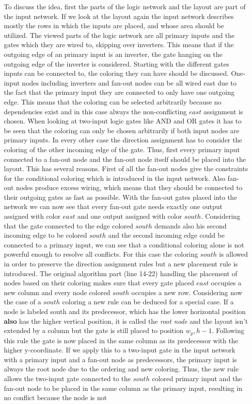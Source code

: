 To discuss the idea, first the parts of the logic network and the layout are part of the input network. If we look at the layout again the input network describes mostly the rows in which the inputs are placed, and whose area should be utilized. The viewed parts of the logic network are all primary inputs and the gates which they are wired to, skipping over inverters. This means that if the outgoing edge of an primary input is an inverter, the gate hanging on the outgoing edge of the inverter is considered. Starting with the different gates inputs can be connected to, the coloring they can have should be discussed. One-input nodes including inverters and fan-out nodes can be all wired east due to the fact that the primary input they are connected to only have one outgoing edge. This means that the coloring can be selected arbitrarily because no dependencies exist and in this case always the non-conflicting $east$ assignment is chosen. When looking at two-input logic gates like AND and OR gates it has to be seen that the coloring can only be chosen arbitrarily if both input nodes are primary inputs. In every other case the direction assignment has to consider the coloring of the other incoming edge of the gate. Thus, first every primary input connected to a fan-out node and the fan-out node itself should be placed into the layout. This has several reasons. First of all the fan-out nodes give the constraints for the conditional coloring which is introduced in the input network. Also fan-out nodes produce excess wiring, which means that they should be connected to their outgoing gates as fast as possible. With the fan-out gates placed into the network we can now see that every fan-out gate needs exactly one output assigned with color $east$ and one output assigned with color $south$. Considering that the gate connected to the edge colored $south$ demands also his second incoming edge to be colored $south$ and the second incoming edge could be connected to a primary input, we can see that a conditional coloring alone is not powerful enough to resolve all conflicts. For this case the coloring $south$ is allowed in order to preserve the direction assignment rules but a new placement rule is introduced. The original algorithm part (line 14-22) handling the placement of nodes based on their coloring makes sure that every gate placed $east$ occupies a new column and every node colored $south$ occupies a new row. Considering now the case of a $south$ coloring a new rule can be deduced for a special case. If a node is labeled south and its predecessor, which has the lower horizontal position \textbf{also} has the higher vertical position, it is called the \textit{root node} and the layout isn't extended by a column but the gate is still placed to position $w_p, h-1$. Following this rule the gate is now placed in the same column as its predecessor with the higher y-coordinate. If we apply this to a two-input gate in the input network with a primary input and a fan-out node as predecessors, the primary input is always the root node due to the ordering and new coloring. Thus, the new rule allows the two-input gate connected to the $south$ colored primary input and the fan-out node to be placed in the same column as the primary input, resulting in no conflict because the node is not 
